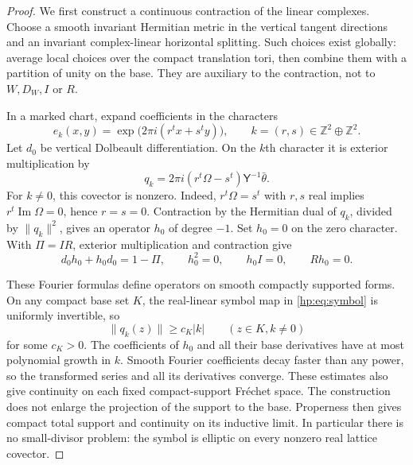\begin{proof}
We first construct a continuous contraction of the linear
complexes. Choose a smooth invariant Hermitian metric in the
vertical tangent directions and an invariant complex-linear
horizontal splitting. Such choices exist globally: average local
choices over the compact translation tori, then combine them with
a partition of unity on the base. They are auxiliary to the
contraction, not to $W,D_W,I$ or $R$.

In a marked chart, expand coefficients in the characters
\[
 e_k(x,y)=\exp\bigl(2\pi i(r^t x+s^t y)\bigr),
 \qquad k=(r,s)\in\mathbb Z^2\oplus\mathbb Z^2.
\]
Let $d_0$ be vertical Dolbeault differentiation. On the $k$th
character it is exterior multiplication by
\begin{equation}\label{hp:eq:symbol}
 q_k=2\pi i(r^t\Omega-s^t)\mathsf Y^{-1}\bar\theta.
\end{equation}
For $k\ne0$, this covector is nonzero. Indeed,
$r^t\Omega=s^t$ with $r,s$ real implies
$r^t\operatorname{Im}\Omega=0$, hence $r=s=0$.
Contraction by the Hermitian dual of $q_k$, divided by
$\lVert q_k\rVert^2$, gives an operator $h_0$ of degree $-1$.
Set $h_0=0$ on the zero character. With $\Pi=IR$, exterior
multiplication and contraction give
\begin{equation}\label{hp:eq:vertical-contraction}
 d_0h_0+h_0d_0=1-\Pi,\qquad
 h_0^2=0,\qquad h_0I=0,\qquad Rh_0=0.
\end{equation}

These Fourier formulas define operators on smooth compactly
supported forms. On any compact base set $K$, the real-linear
symbol map in \eqref{hp:eq:symbol} is uniformly invertible, so
\[
 \lVert q_k(z)\rVert\geq c_K|k|\qquad(z\in K, k\ne0)
\]
for some $c_K>0$. The coefficients of $h_0$ and all their base
derivatives have at most polynomial growth in $k$. Smooth Fourier
coefficients decay faster than any power, so the transformed
series and all its derivatives converge. These estimates also
give continuity on each fixed compact-support Fr\'echet space.
The construction does not enlarge the projection of the support
to the base. Properness then gives compact total support and
continuity on its inductive limit. In particular there is no
small-divisor problem: the symbol is elliptic on every nonzero
real lattice covector.


\end{proof}
